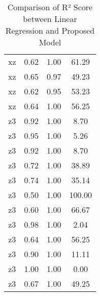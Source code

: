 \begin{table}[h]
\begin{tabular}{|c|c|c|c|}
        xz & 0.62 & 1.00 & 61.29 \\
        xz & 0.65 & 0.97 & 49.23 \\
        xz & 0.62 & 0.95 & 53.23 \\
        xz & 0.64 & 1.00 & 56.25 \\
        z3 & 0.92 & 1.00 & 8.70 \\
        z3 & 0.95 & 1.00 & 5.26 \\
        z3 & 0.92 & 1.00 & 8.70 \\
        z3 & 0.72 & 1.00 & 38.89 \\
        z3 & 0.74 & 1.00 & 35.14 \\
        z3 & 0.50 & 1.00 & 100.00 \\
        z3 & 0.60 & 1.00 & 66.67 \\
        z3 & 0.98 & 1.00 & 2.04 \\
        z3 & 0.64 & 1.00 & 56.25 \\
        z3 & 0.90 & 1.00 & 11.11 \\
        z3 & 1.00 & 1.00 & 0.00 \\
        z3 & 0.67 & 1.00 & 49.25 \\
        \hline
    \end{tabular}
    \caption{Comparison of R² Score between Linear Regression and Proposed Model}
    \label{tab:r2}
\end{table}

